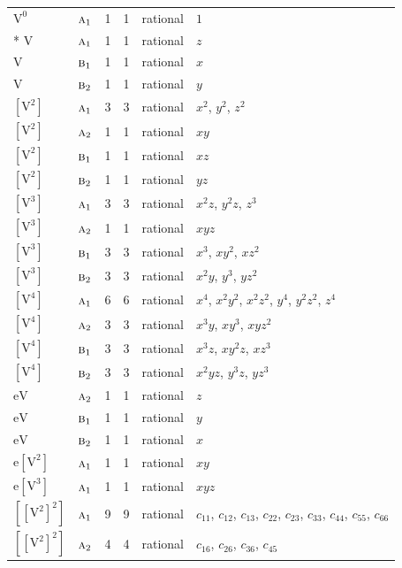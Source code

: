 \documentclass[10pt,a4paper]{article}
\numberwithin{equation}{section}
\newcommand{\irr}[1]{\text{\normalfont\scshape #1}}
\newcommand{\jahn}[1]{\mathrm{#1}}
\newlength{\fillwidth}\newlength{\cellwidth}\newlength{\colwidth}
\begin{document}
{\begin{longtable}{@{}llrrl>{\RaggedRight\arraybackslash}p{\fillwidth}@{}}
\bottomrule\endfoot\endlastfoot
$\jahn{V^{0}}$ & $\irr{a}_{1}$ & 1 & 1 & rational & $1$\\*
$\jahn{V}$ & $\irr{a}_{1}$ & 1 & 1 & rational & $z$\\
$\jahn{V}$ & $\irr{b}_{1}$ & 1 & 1 & rational & $x$\\
$\jahn{V}$ & $\irr{b}_{2}$ & 1 & 1 & rational & $y$\\
$\jahn{[V^{2}]}$ & $\irr{a}_{1}$ & 3 & 3 & rational & $x^{2}$, $y^{2}$, $z^{2}$\\
$\jahn{[V^{2}]}$ & $\irr{a}_{2}$ & 1 & 1 & rational & $xy$\\
$\jahn{[V^{2}]}$ & $\irr{b}_{1}$ & 1 & 1 & rational & $xz$\\
$\jahn{[V^{2}]}$ & $\irr{b}_{2}$ & 1 & 1 & rational & $yz$\\
$\jahn{[V^{3}]}$ & $\irr{a}_{1}$ & 3 & 3 & rational & $x^{2}z$, $y^{2}z$, $z^{3}$\\
$\jahn{[V^{3}]}$ & $\irr{a}_{2}$ & 1 & 1 & rational & $xyz$\\
$\jahn{[V^{3}]}$ & $\irr{b}_{1}$ & 3 & 3 & rational & $x^{3}$, $xy^{2}$, $xz^{2}$\\
$\jahn{[V^{3}]}$ & $\irr{b}_{2}$ & 3 & 3 & rational & $x^{2}y$, $y^{3}$, $yz^{2}$\\
$\jahn{[V^{4}]}$ & $\irr{a}_{1}$ & 6 & 6 & rational & $x^{4}$, $x^{2}y^{2}$, $x^{2}z^{2}$, $y^{4}$, $y^{2}z^{2}$, $z^{4}$\\
$\jahn{[V^{4}]}$ & $\irr{a}_{2}$ & 3 & 3 & rational & $x^{3}y$, $xy^{3}$, $xyz^{2}$\\
$\jahn{[V^{4}]}$ & $\irr{b}_{1}$ & 3 & 3 & rational & $x^{3}z$, $xy^{2}z$, $xz^{3}$\\
$\jahn{[V^{4}]}$ & $\irr{b}_{2}$ & 3 & 3 & rational & $x^{2}yz$, $y^{3}z$, $yz^{3}$\\
$\jahn{eV}$ & $\irr{a}_{2}$ & 1 & 1 & rational & $z$\\
$\jahn{eV}$ & $\irr{b}_{1}$ & 1 & 1 & rational & $y$\\
$\jahn{eV}$ & $\irr{b}_{2}$ & 1 & 1 & rational & $x$\\
$\jahn{e[V^{2}]}$ & $\irr{a}_{1}$ & 1 & 1 & rational & $xy$\\
$\jahn{e[V^{3}]}$ & $\irr{a}_{1}$ & 1 & 1 & rational & $xyz$\\
$\jahn{[[V^{2}]^{2}]}$ & $\irr{a}_{1}$ & 9 & 9 & rational & $c_{11}$, $c_{12}$, $c_{13}$, $c_{22}$, $c_{23}$, $c_{33}$, $c_{44}$, $c_{55}$, $c_{66}$\\
$\jahn{[[V^{2}]^{2}]}$ & $\irr{a}_{2}$ & 4 & 4 & rational & $c_{16}$, $c_{26}$, $c_{36}$, $c_{45}$\\

\end{longtable}}
\end{document}
